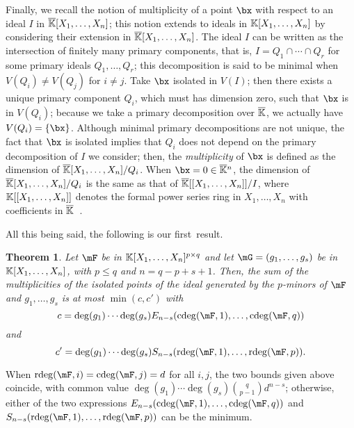 \documentclass[12pt]{article}
\newtheorem{theorem}[definition]{Theorem}
\begin{document}
Finally, we recall the notion of multiplicity of a point $\bx$ with
respect to an ideal $I$ in
$\overline{\mathbb{K}}[X_1,\dots,X_n]$; this notion
extends to ideals in $\mathbb{K}[X_1, \ldots, X_n]$ by considering their
extension in $\overline{\mathbb{K}}[X_1, \ldots, X_n]$. The ideal $I$ can be written
as the intersection of finitely many primary components, that is,
$I=Q_1\cap\cdots \cap Q_r$ for some primary ideals $Q_1,\dots,Q_r$;
this decomposition is said to be minimal when $V(Q_i)\neq V(Q_j)$ for
$i\neq j$. Take $\bx$ isolated in $V(I)$; then there exists a unique
primary component $Q_i$, which must has dimension zero, such that
$\bx$ is in $V(Q_i)$; because we take a primary decomposition over
$\overline{\mathbb{K}}$, we actually have $V(Q_i)=\{\bx\}$. Although minimal primary
decompositions are not unique, the fact that $\bx$ is isolated implies
that $Q_i$ does not depend on the primary decomposition of $I$ we
consider; then, the \emph{multiplicity} of $\bx$ is defined as the
dimension of $\overline{\mathbb{K}}[X_1,\dots,X_n]/Q_i$. When $\bx=0\in\KKbar{}^n$,
the dimension of $\overline{\mathbb{K}}[X_1,\dots,X_n]/Q_i$ is the same as that of
$\overline{\mathbb{K}}[[X_1, \ldots, X_n]]/I$, where $\mathbb{K}[[X_1, \ldots, X_n]]$
denotes the formal power series ring in $X_1, \ldots, X_n$ with
coefficients in $\overline{\mathbb{K}}$~\cite[Theorem 4.2.2]{CLO_UAG}.

All this being said, the following is our first~result.

\begin{theorem}\label{theo:1}
  Let $\mF$ be in $\mathbb{K}[X_1,\dots,X_n]^{p \times q}$ and let
  $\mG=(g_1,\dots,g_s)$ be in $\mathbb{K}[X_1,\dots,X_n]$, with $p \le q$ and
  $n=q-p+s+1$. Then, the sum of the multiplicities of the isolated
  points of the ideal generated by the $p$-minors of $\mF$ and 
$ g_1,\dots,g_s$ is at most
  $\min(c,c')$ with
$$c=\deg(g_1) \cdots \deg(g_s) E_{n-s}(\cdeg(\mF,1), \ldots, \cdeg(\mF,q))$$
and
$$c'=\deg(g_1) \cdots \deg(g_s) S_{n-s}(\rdeg(\mF,1), \ldots, \rdeg(\mF,p)).$$
\end{theorem}
When $\rdeg(\mF,i)=\cdeg(\mF,j)=d$ for all $i,j$, the two bounds given
above coincide, with common value $\deg(g_1) \cdots \deg(g_s) {q \choose {p-1}} d^{n-s}$; otherwise, either of the two expressions
$E_{n-s}(\cdeg(\mF,1), \ldots, \cdeg(\mF,q))$ and
$S_{n-s}(\rdeg(\mF,1), \ldots, \rdeg(\mF,p))$ can be the minimum. 
\end{document}
